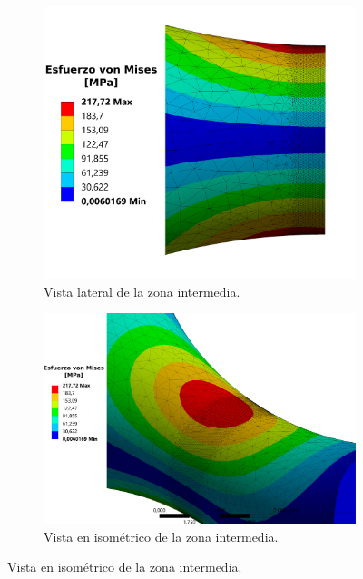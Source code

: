 \begin{figure}[p]
\centering
	\begin{subfigure}{0.8\linewidth}
		\centering
		\includegraphics[width=\linewidth]{Imagenes/esfvm_lat.pdf}
		\caption{Vista lateral de la zona intermedia.}
		\label{fig:corte_lat201}
	\end{subfigure}
	\begin{subfigure}{0.9\linewidth}
		\centering
		\includegraphics[width=\linewidth]{Imagenes/esfvm_iso.pdf}
		\caption{Vista en isométrico de la zona intermedia.}
		\label{fig:iso201}
	\end{subfigure}
\end{figure}
